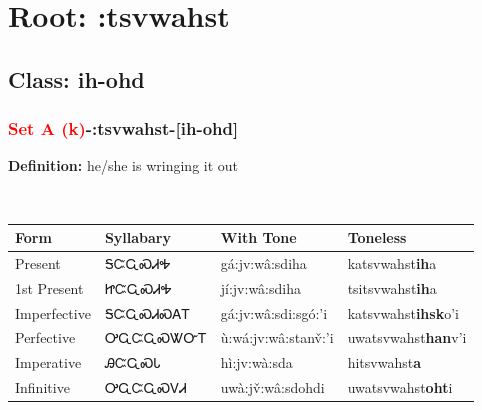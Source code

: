 \needspace{4in}
\section*{Root: :tsvwahst}
\nopagebreak
{}
\needspace{3in}
\subsection*{Class: ih-ohd}
\nopagebreak
\needspace{2in}
\subsubsection*{\textcolor{Red}{Set A (k)}{-}\textbf{:tsvwahst}{-}[ih-ohd]}
\nopagebreak
\textbf{Definition: } he/she is wringing it out
\\[0.5em]
\begin{tabularx}{\textwidth}{l X X X}%
\toprule%
\textbf{Form}&\textbf{Syllabary}&\textbf{With Tone}&\textbf{Toneless}\\%
\midrule%
Present&ᎦᏨᏩᏍᏗᎭ&gá:jv:wâ:sdiha&katsvwahst\textbf{ih}a\\%
1st Present&ᏥᏨᏩᏍᏗᎭ&jí:jv:wâ:sdiha&tsitsvwahst\textbf{ih}a\\%
Imperfective&ᎦᏨᏩᏍᏗᏍᎪᎢ&gá:jv:wâ:sdi:sgó:’i&katsvwahst\textbf{ihsk}o'i\\%
Perfective&ᎤᏩᏨᏩᏍᏔᏅᎢ&ù:wá:jv:wâ:stanv̌:’i&uwatsvwahst\textbf{han}v'i\\%
Imperative&ᎯᏨᏩᏍᏓ&hì:jv:wà:sda&hitsvwahst\textbf{a}\\%
Infinitive&ᎤᏩᏨᏩᏍᏙᏗ&uwà:jv̌:wâ:sdohdi&uwatsvwahst\textbf{oht}i\\%
\bottomrule%
\end{tabularx}
\\[1em]